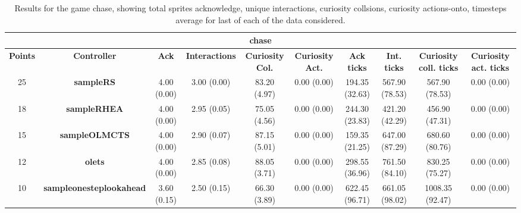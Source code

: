 \begin{table*}[!t]
\begin{center}
\begin{adjustbox}{width=1\textwidth}
\begin{tabular}{|c|c|c|c|c|c|c|c|c|c|}
\multicolumn{10}{c}{\textbf{chase}}\\
\hline
\textbf{Points} & \textbf{Controller} & \textbf{Ack} & \textbf{Interactions} & \textbf{Curiosity Col.} & \textbf{Curiosity Act.} & \textbf{Ack ticks} & \textbf{Int. ticks} & \textbf{Curiosity coll. ticks} & \textbf{Curiosity act. ticks}\\
\hline
25 & \textbf{sampleRS} & 4.00 (0.00) & 3.00 (0.00) & 83.20 (4.97) & 0.00 (0.00) & 194.35 (32.63) & 567.90 (78.53) & 567.90 (78.53) & 0.00 (0.00)
 \\
\hline
18 & \textbf{sampleRHEA} & 4.00 (0.00) & 2.95 (0.05) & 75.05 (4.56) & 0.00 (0.00) & 244.30 (23.83) & 421.20 (42.29) & 456.90 (47.31) & 0.00 (0.00)
 \\
\hline
15 & \textbf{sampleOLMCTS} & 4.00 (0.00) & 2.90 (0.07) & 87.15 (5.01) & 0.00 (0.00) & 159.35 (21.25) & 647.00 (87.29) & 680.60 (80.76) & 0.00 (0.00)
 \\
\hline
12 & \textbf{olets} & 4.00 (0.00) & 2.85 (0.08) & 88.05 (3.71) & 0.00 (0.00) & 298.55 (36.96) & 761.50 (84.10) & 830.25 (75.27) & 0.00 (0.00)
 \\
\hline
10 & \textbf{sampleonesteplookahead} & 3.60 (0.15) & 2.50 (0.15) & 66.30 (3.89) & 0.00 (0.00) & 622.45 (96.71) & 661.05 (98.02) & 1008.35 (92.47) & 0.00 (0.00)
 \\
\hline
\end{tabular}
\end{adjustbox}
\caption{Results for the game chase, showing total sprites acknowledge, unique interactions, curiosity collsions, curiosity actions-onto, timesteps average for last of each of the data considered.}
\label{tab:weights}
\end{center}
\end{table*}
